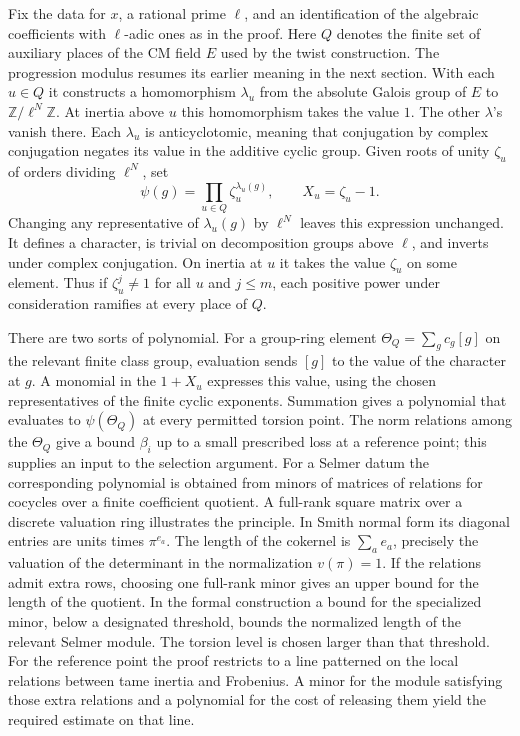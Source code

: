 \documentclass[11pt,letterpaper]{article}
\begin{document}
Fix the data for $x$, a rational prime $\ell$, and an identification of the algebraic coefficients with $\ell$-adic ones as in the proof. Here $Q$ denotes the finite set of auxiliary places of the CM field $E$ used by the twist construction. The progression modulus resumes its earlier meaning in the next section. With each $u\in Q$ it constructs a homomorphism $\lambda_u$ from the absolute Galois group of $E$ to $\mathbb Z/\ell^N\mathbb Z$. At inertia above $u$ this homomorphism takes the value $1$. The other $\lambda$'s vanish there. Each $\lambda_u$ is anticyclotomic, meaning that conjugation by complex conjugation negates its value in the additive cyclic group. Given roots of unity $\zeta_u$ of orders dividing $\ell^N$, set
\[
       \psi(g)=\prod_{u\in Q}\zeta_u^{\lambda_u(g)},\qquad
       X_u=\zeta_u-1 .
\]
Changing any representative of $\lambda_u(g)$ by $\ell^N$ leaves this expression unchanged. It defines a character, is trivial on decomposition groups above $\ell$, and inverts under complex conjugation. On inertia at $u$ it takes the value $\zeta_u$ on some element. Thus if $\zeta_u^j\ne1$ for all $u$ and $j\le m$, each positive power under consideration ramifies at every place of $Q$.

There are two sorts of polynomial. For a group-ring element $\Theta_Q=\sum_g c_g[g]$ on the relevant finite class group, evaluation sends $[g]$ to the value of the character at $g$. A monomial in the $1+X_u$ expresses this value, using the chosen representatives of the finite cyclic exponents. Summation gives a polynomial that evaluates to $\psi(\Theta_Q)$ at every permitted torsion point. The norm relations among the $\Theta_Q$ give a bound $\beta_i$ up to a small prescribed loss at a reference point; this supplies an input to the selection argument. For a Selmer datum the corresponding polynomial is obtained from minors of matrices of relations for cocycles over a finite coefficient quotient. A full-rank square matrix over a discrete valuation ring illustrates the principle. In Smith normal form its diagonal entries are units times $\pi^{e_a}$. The length of the cokernel is $\sum_a e_a$, precisely the valuation of the determinant in the normalization $v(\pi)=1$. If the relations admit extra rows, choosing one full-rank minor gives an upper bound for the length of the quotient. In the formal construction a bound for the specialized minor, below a designated threshold, bounds the normalized length of the relevant Selmer module. The torsion level is chosen larger than that threshold. For the reference point the proof restricts to a line patterned on the local relations between tame inertia and Frobenius. A minor for the module satisfying those extra relations and a polynomial for the cost of releasing them yield the required estimate on that line.
\end{document}
